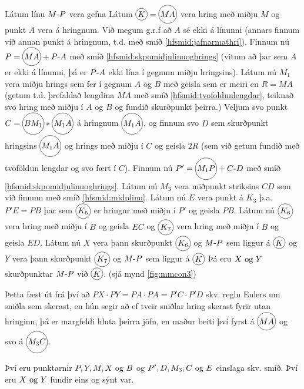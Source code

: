 \begin{frame}[allowframebreaks]
  \begin{hfsmid} \label{hfsmid:skpmidjulinuoghrings}
    Látum línu \(\lin{M}{P}\) vera gefna
    Látum \(\hri{K} = \hri{MA}\) vera hring með miðju \(M\) og punkt \(A\) vera á hringnum.
    Við megum g.r.f að \(A\) sé ekki á línunni (annars finnum við  annan punkt á hringnum, t.d. með smíð \ref{hfsmid:jafnarmathri}).
    Finnum nú \(P = \hri{MA} + \lin{P}{A}\) með smíð \ref{hfsmid:skpomidjulinuoghrings} (vitum að þar sem \(A\) er ekki á línunni,
    þá er \(\lin{P}{A}\) ekki lína í gegnum miðju hringsins).
    Látum nú \(M_1\) vera miðju hrings sem fer í gegnum \(A\) og \(B\) með geisla
    sem er meiri en \(R = MA\) (getum t.d. þrefaldað lengdina \(MA\) með smíð \ref{hfsmid:tvofoldunlengdar},
    teiknað svo hring með miðju í \(A\) og \(B\) og fundið skurðpunkt þeirra.)
    Veljum svo punkt \(C = \hri{BM_1} * \hri{M_1A}\) á hringnum \(\hri{M_1A}\), og
    finnum svo \(D\) sem skurðpunkt hringsins \(\hri{M_1A}\) og hrings með miðju í
    \(C\) og geisla \(2R\) (sem við getum fundið með tvöföldun lengdar og svo fært í \(C\)).
    \theorembreak
    Finnum nú \(P' = \hri{M_1P}+\lin{C}{D}\) með smíð \ref{hfsmid:skpomidjulinuoghrings}.
    Látum nú \(M_3\) vera miðpunkt striksins \(CD\) sem við finnum með smíð \ref{hfsmid:midplinu}.
    Látum nú \(E\) vera punkt á \(K_3\) þ.a.  \(P'E=PB\)  þar sem \(\hri{K_5}\) er hringur
    með miðju í \(P'\) og geisla \(PB\).
    Látum nú \(\hri{K_6}\) vera hring með miðju í \(B\) og geisla \(EC\) og
    \(\hri{K_7}\) vera hring með miðju í \(B\) og geisla \(ED\).
    Látum nú \(X \)  vera þann skurðpunkt \(\hri{K_6}\)  og \(\lin{M}{P}\)
    sem liggur á \(\hri{K}\)
    og \(Y \)  vera þann skurðpunkt \(\hri{K_7}\)  og \(\lin{M}{P}\)
    sem liggur á \(\hri{K}\)
    Þá eru \(X \Og Y \) skurðpunktar \(\lin{M}{P}\) við \(\hri{K}\).
    (sjá mynd \ref{fig:mmcon3})

  \end{hfsmid}
\end{frame}

\begin{frame}
    Þetta fæst út frá því að \(PX \cdot PY = PA \cdot PA = P'C \cdot P'D\) skv.
    reglu Eulers um sniðla sem skerast, en hún segir að
    ef tveir sniðlar hring skerast fyrir utan hringinn, þá er margfeldi hluta
    þeirra jöfn, en maður beiti því fyrst á \(\hri{MA}\) og svo á
    \(\hri{M_3C}\).

    Því eru punktarnir \(P,Y,M,X \Og B\) og
    \(P',D,M_3, C \Og E\) einslaga skv. smíð. Því eru \(X \Og Y\) fundir eins
    og sýnt var.
\end{frame}

